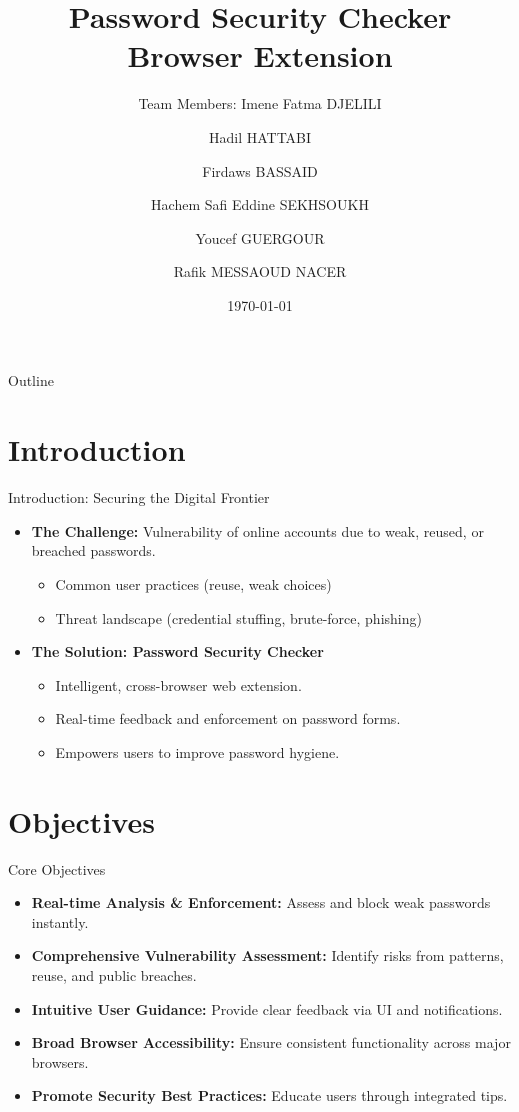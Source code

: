 \documentclass[aspectratio=169]{beamer}
\title{Password Security Checker\\Browser Extension}
\author{Team Members: \newline Imene Fatma DJELILI \\
\and Hadil HATTABI \\
\and Firdaws BASSAID \\
\and Hachem Safi Eddine SEKHSOUKH \\
\and Youcef GUERGOUR \\
\and Rafik MESSAOUD NACER}
\institute{National higher school of artificial intelligence (ENSIA)}
\date{\today}
\begin{document}
\begin{frame}
  \titlepage
\end{frame}

\begin{frame}{Outline}
  \vspace{0.5em} 
  \tableofcontents
  \vspace{0.5em} 
\end{frame}

\section{Introduction}
\begin{frame}{Introduction: Securing the Digital Frontier}
  \begin{itemize}
    \item \textbf{The Challenge:} Vulnerability of online accounts due to weak, reused, or breached passwords.
    \begin{itemize}
      \item Common user practices (reuse, weak choices)
      \item Threat landscape (credential stuffing, brute-force, phishing)
    \end{itemize}
    \item \textbf{The Solution: Password Security Checker}
    \begin{itemize}
       \item Intelligent, cross-browser web extension.
       \item Real-time feedback and enforcement on password forms.
       \item Empowers users to improve password hygiene.
    \end{itemize}
  \end{itemize}
\end{frame}

\section{Objectives}
\begin{frame}{Core Objectives}
  \begin{itemize}
    \item \textbf{Real-time Analysis \& Enforcement:} Assess and block weak passwords instantly.
    \item \textbf{Comprehensive Vulnerability Assessment:} Identify risks from patterns, reuse, and public breaches.
    \item \textbf{Intuitive User Guidance:} Provide clear feedback via UI and notifications.
    \item \textbf{Broad Browser Accessibility:} Ensure consistent functionality across major browsers.
    \item \textbf{Promote Security Best Practices:} Educate users through integrated tips.
  \end{itemize}
\end{frame}
\end{document}

